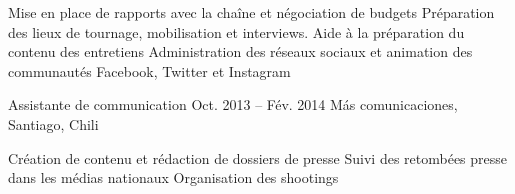 \begin{joblist}
{		\iftbftiny \vspace{-0.5cm} \fi
			\begin{itemize}
			  \iftbftiny \setlength\itemsep{-3pt} \fi
			  \cvitem[\checkmark] Mise en place de rapports avec la chaîne et négociation de budgets                       
			  \cvitem[\checkmark] Préparation des lieux de tournage, mobilisation et interviews. Aide à la préparation du contenu des entretiens 
			  \cvitem[\checkmark] Administration des réseaux sociaux et animation des communautés Facebook, Twitter et Instagram                
			\end{itemize}     
			
	}



\item[Assistante de communication]{Oct. 2013 -- Fév. 2014 }     
  	{
  	Más comunicaciones, Santiago, Chili
  	}     
  	{

		\iftbftiny \vspace{-0.5cm} \fi
		\begin{itemize}
			  \iftbftiny \setlength\itemsep{-3pt} \fi
			  \cvitem[\checkmark]  Création de contenu et rédaction de dossiers de presse                                        
			  \cvitem[\checkmark]  Suivi des retombées presse dans les médias nationaux                                             
			  \cvitem[\checkmark]  Organisation des shootings

		\end{itemize}       
	}



   

\end{joblist}


